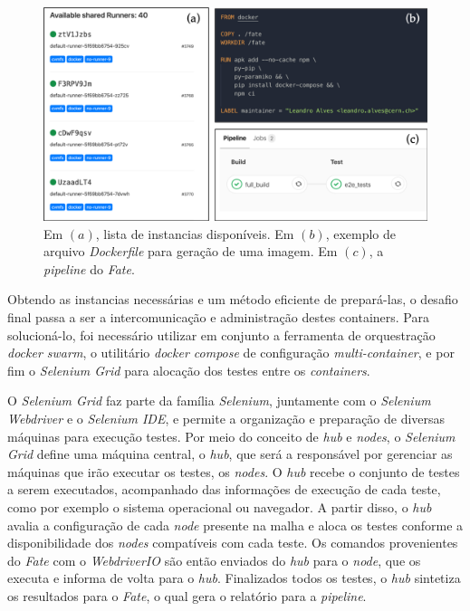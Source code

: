 \begin{figure}[H]
    \centering
    \includegraphics[width=15cm]{source/4-solucao/images/e2e-pipeline.png}
    \caption{Em $(a)$, lista de instancias disponíveis. Em $(b)$, exemplo de arquivo \emph{Dockerfile} para geração de uma imagem. Em $(c)$, a \emph{pipeline} do \emph{Fate}.}
    \label{fig:e2e-pipeline}
\end{figure}

Obtendo as instancias necessárias e um método eficiente de prepará-las, o desafio final passa a ser a intercomunicação e administração destes containers. Para solucioná-lo, foi necessário utilizar em conjunto a ferramenta de orquestração \emph{docker swarm}, o utilitário \emph{docker compose} de configuração \emph{multi-container}, e por fim o \emph{Selenium Grid} para alocação dos testes entre os \emph{containers}.

O \emph{Selenium Grid} faz parte da família \emph{Selenium}, juntamente com o \emph{Selenium Webdriver} e o \emph{Selenium IDE}, e permite a organização e preparação de diversas máquinas para execução testes. Por meio do conceito de \emph{hub} e \emph{nodes}, o \emph{Selenium Grid} define uma máquina central, o \emph{hub}, que será a responsável por gerenciar as máquinas que irão executar os testes, os \emph{nodes}. O \emph{hub} recebe o conjunto de testes a serem executados, acompanhado das informações de execução de cada teste, como por exemplo o sistema operacional ou navegador. A partir disso, o \emph{hub} avalia a configuração de cada \emph{node} presente na malha e aloca os testes conforme a disponibilidade dos \emph{nodes} compatíveis com cada teste. Os comandos provenientes do \emph{Fate} com o \emph{WebdriverIO} são então enviados do \emph{hub} para o \emph{node}, que os executa e informa de volta para o \emph{hub}. Finalizados todos os testes, o \emph{hub} sintetiza os resultados para o \emph{Fate}, o qual gera o relatório para a \emph{pipeline}.

